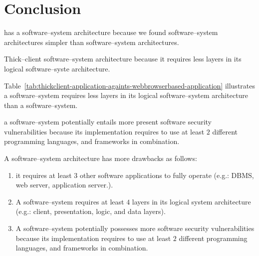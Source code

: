 \chapter{Conclusion}

\yerotherpblack has a \thickclient
software--system architecture because we
found \thickclient software--system
architectures simpler than \webbrowserbased
software--system architectures.

Thick--client software--system architecture because it
requires less layers in its logical
software--syste architecture.

Table~\ref{tab:thickclient-application-againts-webbrowserbased-application}
illustrates a \thickclient software--system
requires less layers in its logical
software--system architecture than a
\webbrowserbased software--system.

a \webbrowserbased software--system
potentially entails more present
software security vulnerabilities 
because its implementation requires
to use at least $2$ different programming
languages, and frameworks in combination.

A \webbrowserbased software--system
architecture has more drawbacks as
follows:

\begin{enumerate}[1)]
	\item it requires at least $3$ other 
		software applications to fully operate
		(e.g.: DBMS, web server, application server.).
		
	\item A \webbrowserbased software--system
		requires at least $4$ layers in
		its logical system architecture
		(e.g.: client, presentation, logic,
		and data layers).

	\item A \webbrowserbased software--system
		potentially possesses more software
		security vulnerabilities because its
		implementation requires to use at least
		$2$ different programming languages, and
		frameworks in combination.
\end{enumerate}

